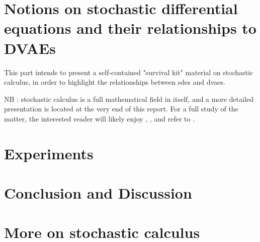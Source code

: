 \documentclass[twoside,11pt]{report}
\begin{document}
    
    
    
    
    

% 
%
%
%

\part{Notions on stochastic differential equations and their relationships to DVAEs}

This part intends to present a self-contained "survival kit" material on stochastic calculus, in order to highlight the relationships between \glspl{sde} and \glspl{dvae}.

NB : stochastic calculus is a full mathematical field in itself, and a more detailed presentation is located at the very end of this report. For a full study
of the matter, the interested reader will likely enjoy \cite{mouvement-brownien-calcul-ito}, \cite{sarkka_applied_2019}, and refer to \cite{cours-jf-legall}.

    
    
    

\part{Experiments}

    

\part{Conclusion and Discussion}

    

%
%
%
%
\part{More on stochastic calculus}

    
    
    

\begin{appendices}
    
\end{appendices}

\clearpage

\printglossary
\clearpage


\printbibliography
\clearpage
\end{document}
